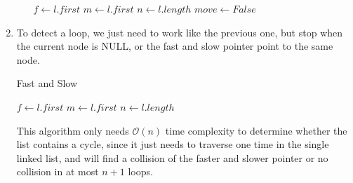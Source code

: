 \documentclass[12pt, a4paper]{article}
\begin{document}
\begin{enumerate}
\begin{itemize}
\begin{algorithm}[!htb]
                        $f \leftarrow l.first$\;
                        $m \leftarrow l.first$\;
                        $n \leftarrow l.length$\;
                        $move \leftarrow False$\;
                        \;
                    \end{algorithm}
          \end{itemize}
    \newpage
    \item To detect a loop, we just need to work like the previous one, but stop when the current node is NULL, 
          or the fast and slow pointer point to the same node.
          \begin{algorithm}[!htb]
              \caption{Fast and Slow}
              \BlankLine

              $f \leftarrow l.first$\;
              $m \leftarrow l.first$\;
              $n \leftarrow l.length$\;
              \;
          \end{algorithm}
          \newpage
          This algorithm only needs $\mathcal{O}(n)$ time complexity to determine whether the list contains a cycle, 
          since it just needs to traverse one time in the single linked list, 
          and will find a collision of the faster and slower pointer or no collision in at most $n + 1$ loops.
    
\end{enumerate}
\end{document}
